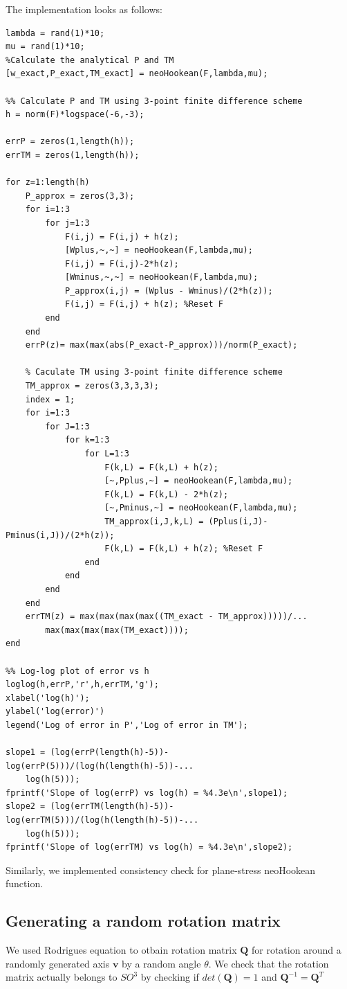 \message{ !name(p2.tex)}\documentclass[../main.tex]{subfiles}
\begin{document}
The implementation looks as follows:
\begin{lstlisting}[style=Matlab-editor]
lambda = rand(1)*10;
mu = rand(1)*10;
%Calculate the analytical P and TM
[w_exact,P_exact,TM_exact] = neoHookean(F,lambda,mu);

%% Calculate P and TM using 3-point finite difference scheme
h = norm(F)*logspace(-6,-3);

errP = zeros(1,length(h));
errTM = zeros(1,length(h));

for z=1:length(h)
    P_approx = zeros(3,3);
    for i=1:3
        for j=1:3
            F(i,j) = F(i,j) + h(z);
            [Wplus,~,~] = neoHookean(F,lambda,mu);
            F(i,j) = F(i,j)-2*h(z);
            [Wminus,~,~] = neoHookean(F,lambda,mu);
            P_approx(i,j) = (Wplus - Wminus)/(2*h(z));
            F(i,j) = F(i,j) + h(z); %Reset F
        end
    end
    errP(z)= max(max(abs(P_exact-P_approx)))/norm(P_exact);
    
    % Caculate TM using 3-point finite difference scheme
    TM_approx = zeros(3,3,3,3);
    index = 1;
    for i=1:3
        for J=1:3
            for k=1:3
                for L=1:3
                    F(k,L) = F(k,L) + h(z);
                    [~,Pplus,~] = neoHookean(F,lambda,mu);
                    F(k,L) = F(k,L) - 2*h(z);
                    [~,Pminus,~] = neoHookean(F,lambda,mu);
                    TM_approx(i,J,k,L) = (Pplus(i,J)-Pminus(i,J))/(2*h(z));
                    F(k,L) = F(k,L) + h(z); %Reset F
                end
            end
        end
    end
    errTM(z) = max(max(max(max((TM_exact - TM_approx)))))/...
        max(max(max(max(TM_exact))));
end

%% Log-log plot of error vs h
loglog(h,errP,'r',h,errTM,'g');
xlabel('log(h)');
ylabel('log(error)')
legend('Log of error in P','Log of error in TM');

slope1 = (log(errP(length(h)-5))-log(errP(5)))/(log(h(length(h)-5))-...
    log(h(5)));
fprintf('Slope of log(errP) vs log(h) = %4.3e\n',slope1);
slope2 = (log(errTM(length(h)-5))-log(errTM(5)))/(log(h(length(h)-5))-...
    log(h(5)));
fprintf('Slope of log(errTM) vs log(h) = %4.3e\n',slope2);
\end{lstlisting}

Similarly, we implemented consistency check for plane-stress
neoHookean function.

\subsection{Generating a random rotation matrix}
We used Rodrigues equation to otbain rotation matrix $\mathbf{Q}$ for
rotation around a randomly generated axis $\mathbf{v}$ by a random
angle $\theta$. We check that the rotation matrix actually belongs to
$SO^3$ by checking if $det(\mathbf{Q}) = 1$ and
$\mathbf{Q}^{-1} =\mathbf{Q}^T $
\end{document}
